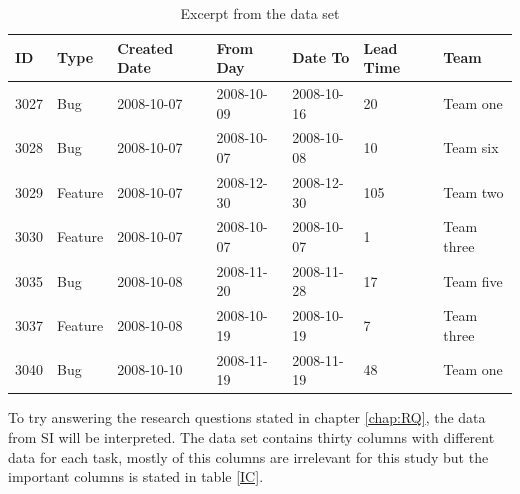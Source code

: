 \documentclass[UKenglish]{ifimaster}  %
\begin{document}
\begin{table}[!ht]
\begin{center}
\begin{tabular}{|l|l|l|l|l|l|l|}
\hline
ID	& Type &  Created Date & From Day & Date To & Lead Time & Team \\ \hline
    3027 & Bug & 2008-10-07 &  2008-10-09 & 2008-10-16 & 20 & Team one\\ \hline
   3028 & Bug  & 2008-10-07 & 2008-10-07 & 2008-10-08 & 10 & Team six\\ \hline
   3029 & Feature & 2008-10-07 &  2008-12-30	 & 2008-12-30 & 105 & Team two\\ \hline
    3030 & Feature & 2008-10-07 & 2008-10-07	& 2008-10-07 & 1& Team three\\ \hline
   3035 & Bug & 2008-10-08 & 2008-11-20 & 2008-11-28 & 17 & Team five\\ \hline
   3037 & Feature & 2008-10-08 &  2008-10-19	 & 2008-10-19 & 7 & Team three\\ \hline
   3040 & Bug & 2008-10-10 &  2008-11-19 & 2008-11-19 & 48 & Team one\\ \hline
   \end{tabular}
\caption{Excerpt from the data set}
\label{dataset}
\end{center}
\end{table}

To try answering the research questions stated in chapter \ref{chap:RQ}, the data from SI will be interpreted. The data set contains thirty columns with different data for each task, mostly of this columns are irrelevant for this study but the important columns is stated in table \ref{IC}.
\end{document}
